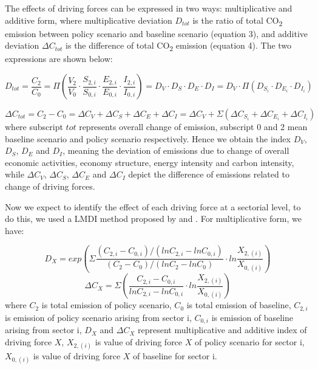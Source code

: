 \documentclass[
]{article}
\begin{document}
The effects of driving forces can be expressed in two ways:
multiplicative and additive form, where multiplicative deviation
\(D_{tot}\) is the ratio of total CO\textsubscript{2} emission between
policy scenario and baseline scenario (equation 3), and additive
deviation \(\Delta C_{tot}\) is the difference of total
CO\textsubscript{2} emission (equation 4). The two expressions are shown
below:

\[ D_{tot} =\frac{C_{2}}{C_{0}} = \Pi(\frac{V_{2}}{V_{0}} \cdot \frac{S_{2,i}}{S_{0,i}} \cdot \frac{E_{2,i}}{E_{0,i}}  \cdot \frac{I_{2,i}}{I_{0,i}}) = D_{V}  \cdot  D_{S} \cdot D_{E} \cdot D_{I} = D_{V}  \cdot \Pi ( D_{S_{i}} \cdot D_{E_{i}} \cdot D_{I_{i}}) \tag{3}\]

\[ \Delta C_{tot} = C_{2} - C_{0} = \Delta C_{V} + \Delta C_{S} + \Delta C_{E} + \Delta C_{I} = \Delta C_{V} + \Sigma( \Delta C_{S_{i}} + \Delta C_{E_{i}} + \Delta C_{I_{i}}) \tag{4}\]
where subscript \(tot\) represents overall change of emission, subscript
0 and 2 mean baseline scenario and policy scenario respectively. Hence
we obtain the index \(D_{V}\), \(D_{S}\), \(D_{E}\) and \(D_{I}\),
meaning the deviation of emissions due to change of overall economic
activities, economy structure, energy intensity and carbon intensity,
while \(\Delta C_{V}\), \(\Delta C_{S}\), \(\Delta C_{E}\) and
\(\Delta C_{I}\) depict the difference of emissions related to change of
driving forces.

Now we expect to identify the effect of each driving force at a
sectorial level, to do this, we used a LMDI method proposed by
\textcite{ang1997} and \textcite{ang2005}. For multiplicative form, we
have:

\[ D_{X} = exp ( \Sigma \frac{(C_{2,i}-C_{0,i})/(lnC_{2,i}-lnC_{0,i})}{(C_{2}-C_{0})/(lnC_{2}-lnC_{0})} \cdot ln \frac{X_{2,(i)}}{X_{0,(i)}} ) \tag{11}\]
\[ \Delta C_{X} =  \Sigma (\frac{C_{2,i}-C_{0,i}}{lnC_{2,i}-lnC_{0,i}} \cdot ln\frac{X_{2,(i)}}{X_{0,(i)}}) \tag{12} \]
where \(C_{2}\) is total emission of policy scenario, \(C_{0}\) is total
emission of baseline, \(C_{2,i}\) is emission of policy scenario arising
from sector i, \(C_{0,i}\) is emission of baseline arising from sector
i, \(D_{X}\) and \(\Delta C_{X}\) represent multiplicative and additive
index of driving force \(X\), \(X_{2,(i)}\) is value of driving force
\(X\) of policy scenario for sector i, \(X_{0,(i)}\) is value of driving
force \(X\) of baseline for sector i.
\end{document}
